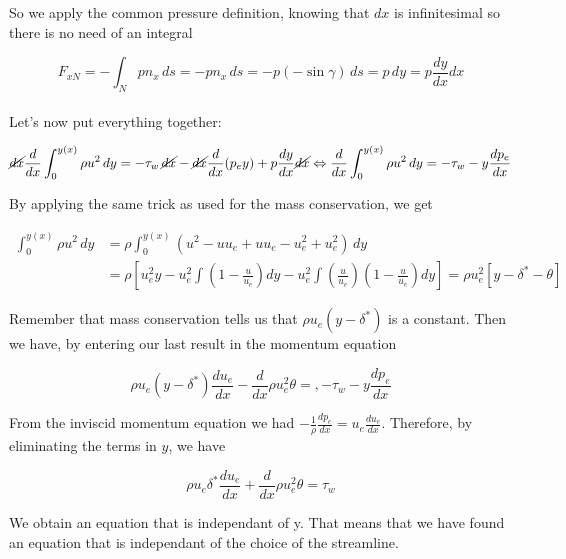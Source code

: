 So we apply the common pressure definition, knowing that $dx$ is infinitesimal so there is no need of an integral 

\begin{equation}
F_{xN}=- \int_N p n_x \,d s =-p n_x \, d s =-p(-\sin \gamma)\, ds=p \, dy=p \frac{dy}{d x} dx
\end{equation}
\ \\

Let's now put everything together:

\begin{equation}
\cancel{dx} \frac{d}{dx} \int_{0}^{y(x)} \rho u^2 \, dy=-\tau_w \,\cancel{dx}-\cancel{dx} \frac{d}{dx}(p_ey)+p \frac{d y}{d x} \cancel{dx} \Leftrightarrow  \frac{d}{dx} \int_{0}^{y(x)} \rho u^2 \, dy=-\tau_w - y\frac{dp_e}{dx}
\end{equation}

By applying the same trick as used for the mass conservation, we get

\begin{equation}
\begin{aligned}
\int_{0}^{y(x)} \rho u^2 \, dy &= \rho \int_{0}^{y(x)}  (u^2-uu_e+uu_e-u_e^2+u_e^2) \, dy\\
&=\rho \left[u_e^2y-u_e^2 \int (1-\frac{u}{u_e})dy-u_e^2 \int (\frac{u}{u_e})(1-\frac{u}{u_e})dy\right] = \rho u_e^2[y-\delta^*-\theta]
\end{aligned}
\end{equation}

Remember that mass conservation tells us that $\rho u_e(y-\delta^*)$ is a constant. Then we have, by entering our last result in the momentum equation

\begin{equation}
\rho u_e(y-\delta^*)\frac{d u_e}{d x}- \frac{d}{d x} \rho u_e^2\theta =,-\tau_w-y \frac{d p_e}{d x} 
\end{equation}

From the inviscid momentum equation we had $
- \frac{1}{\rho}\frac{d p_e}{d x} = u_e \frac{d u_e}{d x}$. Therefore, by eliminating the terms in $y$, we have

\begin{equation}
 \rho u_e\delta^* \frac{d u_e}{d x}+ \frac{d}{d x} \rho u_e^2 \theta=\tau_w
\end{equation}

We obtain an equation that is independant of y. That means that we have found an equation that is independant of the choice of the streamline.

